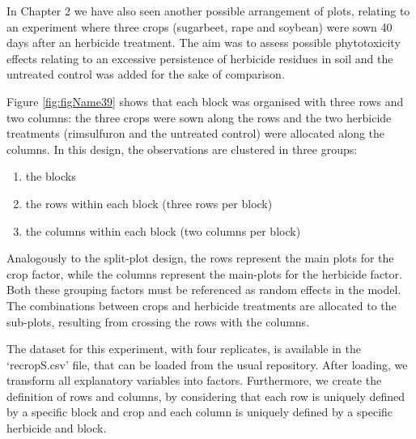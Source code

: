 \documentclass[a4paper,12pt,oneside]{book}
\providecommand{\tightlist}{%
  \setlength{\itemsep}{0pt}\setlength{\parskip}{0pt}}
\begin{document}
In Chapter 2 we have also seen another possible arrangement of plots, relating to an experiment where three crops (sugarbeet, rape and soybean) were sown 40 days after an herbicide treatment. The aim was to assess possible phytotoxicity effects relating to an excessive persistence of herbicide residues in soil and the untreated control was added for the sake of comparison.

Figure \ref{fig:figName39} shows that each block was organised with three rows and two columns: the three crops were sown along the rows and the two herbicide treatments (rimsulfuron and the untreated control) were allocated along the columns. In this design, the observations are clustered in three groups:

\begin{enumerate}
\def\labelenumi{\arabic{enumi}.}
\tightlist
\item
  the blocks
\item
  the rows within each block (three rows per block)
\item
  the columns within each block (two columns per block)
\end{enumerate}

Analogously to the split-plot design, the rows represent the main plots for the crop factor, while the columns represent the main-plots for the herbicide factor. Both these grouping factors must be referenced as random effects in the model. The combinations between crops and herbicide treatments are allocated to the sub-plots, resulting from crossing the rows with the columns.

The dataset for this experiment, with four replicates, is available in the `recropS.csv' file, that can be loaded from the usual repository. After loading, we transform all explanatory variables into factors. Furthermore, we create the definition of rows and columns, by considering that each row is uniquely defined by a specific block and crop and each column is uniquely defined by a specific herbicide and block.
\end{document}
